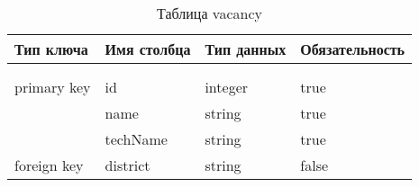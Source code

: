 \begin{xltabular}{\textwidth}{|l|l|p{1.7cm}|X|}
	\caption{Таблица vacancy \label{city:table}}\\ \hline
	\centrow Тип ключа & \centrow Имя столбца & \centrow Тип
	данных & \centrow Обязательность \\ \hline
	 &  &  &  \\ \hline
	\endfirsthead
	 &  &  &  \\ \hline
	\finishhead
	primary key & id & integer & true \\ \hline 
	& name & string & true \\ \hline 
	& techName & string & true \\ \hline 
	foreign key & district & string & false \\ \hline 
\end{xltabular}
